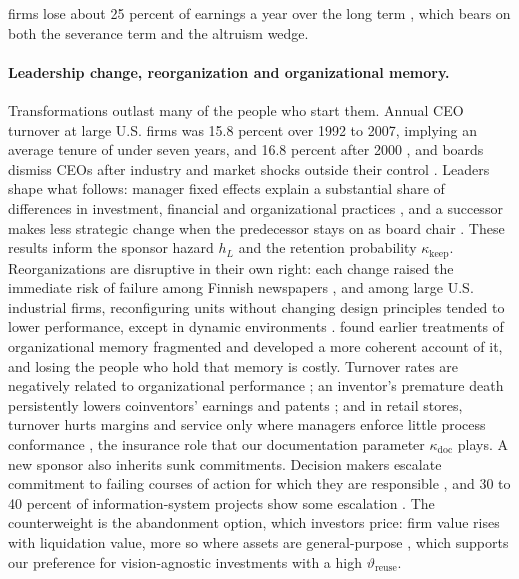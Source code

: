 firms lose about 25 percent of earnings a year over the long term \citep{jacobson1993earnings}, which bears on both the severance term and the altruism wedge.

\paragraph{Leadership change, reorganization and organizational memory.} Transformations outlast many of the people who start them. Annual CEO turnover at large U.S. firms was 15.8 percent over 1992 to 2007, implying an average tenure of under seven years, and 16.8 percent after 2000 \citep{kaplan2012how}, and boards dismiss CEOs after industry and market shocks outside their control \citep{jenter2015ceo}. Leaders shape what follows: manager fixed effects explain a substantial share of differences in investment, financial and organizational practices \citep{bertrand2003managing}, and a successor makes less strategic change when the predecessor stays on as board chair \citep{quigley2012when}. These results inform the sponsor hazard $h_L$ and the retention probability $\kappa_{\mathrm{keep}}$. Reorganizations are disruptive in their own right: each change raised the immediate risk of failure among Finnish newspapers \citep{amburgey1993resetting}, and among large U.S. industrial firms, reconfiguring units without changing design principles tended to lower performance, except in dynamic environments \citep{girod2017reconfiguration}. \citet{walsh1991organizational} found earlier treatments of organizational memory fragmented and developed a more coherent account of it, and losing the people who hold that memory is costly. Turnover rates are negatively related to organizational performance \citep{hausknecht2011collective,park2013turnover}; an inventor's premature death persistently lowers coinventors' earnings and patents \citep{jaravel2018team}; and in retail stores, turnover hurts margins and service only where managers enforce little process conformance \citep{ton2008managing}, the insurance role that our documentation parameter $\kappa_{\mathrm{doc}}$ plays. A new sponsor also inherits sunk commitments. Decision makers escalate commitment to failing courses of action for which they are responsible \citep{staw1976knee,staw1981escalation,brockner1992escalation}, and 30 to 40 percent of information-system projects show some escalation \citep{keil2000why}. The counterweight is the abandonment option, which investors price: firm value rises with liquidation value, more so where assets are general-purpose \citep{berger1996investor}, which supports our preference for vision-agnostic investments with a high $\vartheta_{\mathrm{reuse}}$.

